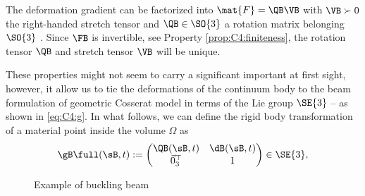 \begin{prop} The deformation gradient can be factorized into $\mat{F} = \QB \VB$ with $\VB \succ 0$ the right-handed stretch tensor and $\QB \in \SO{3}$ a rotation matrix belonging $\SO{3}$ \cite{Holzapfel2002,Kim2018,Smith2018}. Since $\FB$ is invertible, see Property \ref{prop:C4:finiteness}, the rotation tensor $\QB$ and stretch tensor $\VB$ will be unique.
\end{prop} 

These properties might not seem to carry a significant important at first sight, however, it allow us to tie the deformations of the continuum body to the beam formulation of geometric Cosserat model in terms of the Lie group $\SE{3}$ \cite{Renda2020,Simo1986,Boyer2021} -- as shown in \eqref{eq:C4:g}. In what follows, we can define the rigid body transformation of a material point inside the volume $\Omega$ as
%
\begin{equation}
\gB\full(\sB,t):= \begin{pmatrix}
    \QB(\sB,t) & \dB(\sB,t) \\
    \vec{0}_3^\top & 1
    \end{pmatrix} \in \SE{3},
\end{equation}

\begin{figure}[!t]
    \ifx\printFigures\undefined
    \else
    \centering
    
    \vspace{1mm}
    \fi
    \caption{Example of buckling beam }
    \label{fig:C4:pneunet}
    \vspace{-5mm}
  \end{figure}

